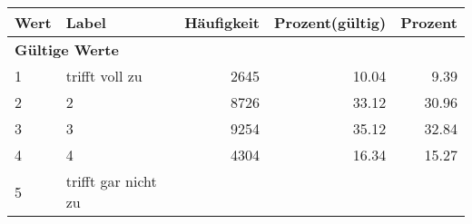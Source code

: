      \begin{longtable}{lXrrr}
     \toprule
     \textbf{Wert} & \textbf{Label} & \textbf{Häufigkeit} & \textbf{Prozent(gültig)} & \textbf{Prozent} \\
     \endhead
     \midrule
     \multicolumn{5}{l}{\textbf{Gültige Werte}}\\

     1 &
     \multicolumn{1}{X}{ trifft voll zu   } &


       \num{2645} &
       \num[round-mode=places,round-precision=2]{10.04} &
         \num[round-mode=places,round-precision=2]{9.39} \\

     2 &
     \multicolumn{1}{X}{ 2   } &


       \num{8726} &
       \num[round-mode=places,round-precision=2]{33.12} &
         \num[round-mode=places,round-precision=2]{30.96} \\

     3 &
     \multicolumn{1}{X}{ 3   } &


       \num{9254} &
       \num[round-mode=places,round-precision=2]{35.12} &
         \num[round-mode=places,round-precision=2]{32.84} \\

     4 &
     \multicolumn{1}{X}{ 4   } &


       \num{4304} &
       \num[round-mode=places,round-precision=2]{16.34} &
         \num[round-mode=places,round-precision=2]{15.27} \\

     5 &
     \multicolumn{1}{X}{ trifft gar nicht zu   } &



\end{longtable}
